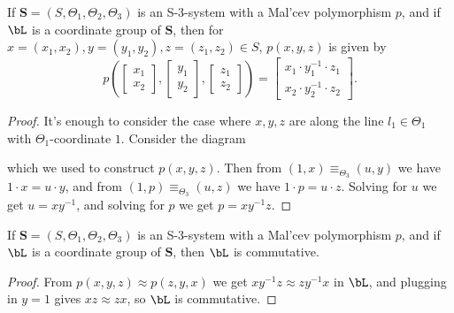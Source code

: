 \begin{lem}\label{S3-malcev-loop} If $\mathbf{S} = (S,\Theta_1,\Theta_2,\Theta_3)$ is an S-3-system with a Mal'cev polymorphism $p$, and if $\bL$ is a coordinate group of $\mathbf{S}$, then for $x = (x_1,x_2), y = (y_1,y_2), z = (z_1,z_2) \in S$, $p(x,y,z)$ is given by
\[
p\left(\begin{bmatrix} x_1\\ x_2\end{bmatrix}, \begin{bmatrix} y_1\\ y_2\end{bmatrix}, \begin{bmatrix} z_1\\ z_2\end{bmatrix}\right) = \begin{bmatrix} x_1\cdot y_1^{-1}\cdot z_1\\ x_2\cdot y_2^{-1}\cdot z_2\end{bmatrix}.
\]
\end{lem}
\begin{proof} It's enough to consider the case where $x,y,z$ are along the line $l_1 \in \Theta_1$ with $\Theta_1$-coordinate $1$. Consider the diagram
\begin{center}
\end{center}
which we used to construct $p(x,y,z)$. Then from $(1,x) \equiv_{\Theta_3} (u,y)$ we have $1\cdot x = u\cdot y$, and from $(1,p) \equiv_{\Theta_3} (u,z)$ we have $1 \cdot p = u \cdot z$. Solving for $u$ we get $u = xy^{-1}$, and solving for $p$ we get $p = xy^{-1}z$.
\end{proof}

\begin{cor} If $\mathbf{S} = (S,\Theta_1,\Theta_2,\Theta_3)$ is an S-3-system with a Mal'cev polymorphism $p$, and if $\bL$ is a coordinate group of $\mathbf{S}$, then $\bL$ is commutative.
\end{cor}
\begin{proof} From $p(x,y,z) \approx p(z,y,x)$ we get $xy^{-1}z \approx zy^{-1}x$ in $\bL$, and plugging in $y = 1$ gives $xz \approx zx$, so $\bL$ is commutative.
\end{proof}

